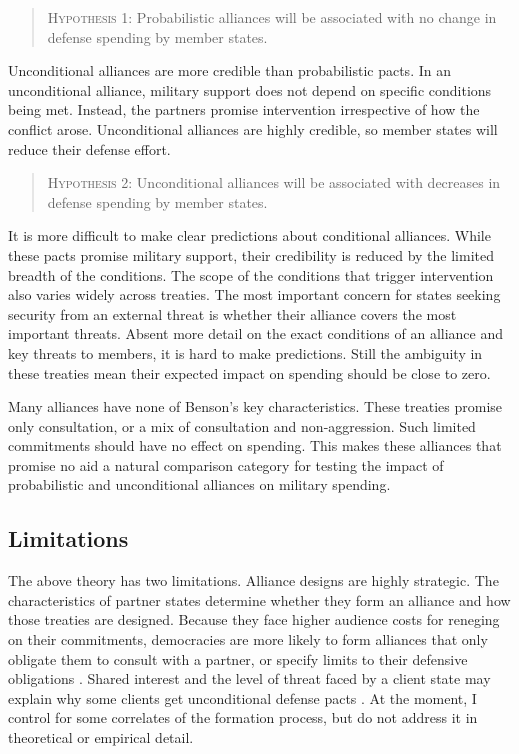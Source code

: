 \documentclass[12pt]{article}
\begin{document}
\begin{quote}
\textsc{Hypothesis 1}: Probabilistic alliances will be associated with no change in defense spending by member states. 
\end{quote}

Unconditional alliances are more credible than probabilistic pacts. In an unconditional alliance, military support does not depend on specific conditions being met. Instead, the partners promise intervention irrespective of how the conflict arose. Unconditional alliances are highly credible, so member states will reduce their defense effort. 

\begin{quote}
\textsc{Hypothesis 2}: Unconditional alliances will be associated with decreases in defense spending by member states. 
\end{quote} 

It is more difficult to make clear predictions about conditional alliances. While these pacts promise military support, their credibility is reduced by the limited breadth of the conditions. The scope of the conditions that trigger intervention also varies widely across treaties. The most important concern for states seeking security from an external threat is whether their alliance covers the most important threats. Absent more detail on the exact conditions of an alliance and key threats to members, it is hard to make predictions. Still the ambiguity in these treaties mean their expected impact on spending should be close to zero.

Many alliances have none of Benson's key characteristics. These treaties promise only consultation, or a mix of consultation and non-aggression. Such limited commitments should have no effect on spending. This makes these alliances that promise no aid a natural comparison category for testing the impact of probabilistic and unconditional alliances on military spending. 

\subsection*{Limitations} 

The above theory has two limitations. Alliance designs are highly strategic. The characteristics of partner states determine whether they form an alliance and how those treaties are designed. Because they face higher audience costs for reneging on their commitments, democracies are more likely to form alliances that only obligate them to consult with a partner, or specify limits to their defensive obligations \citep{Chibaetal2015}. Shared interest and the level of threat faced by a client state may explain why some clients get unconditional defense pacts \citep{Yarhi-Miloetal2016}. At the moment, I control for some correlates of the formation process, but do not address it in theoretical or empirical detail.
\end{document}
